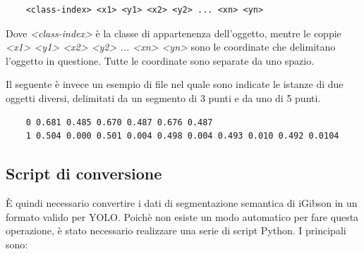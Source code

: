 \documentclass[12pt]{report}
\begin{document}
\begin{verbatim}
	<class-index> <x1> <y1> <x2> <y2> ... <xn> <yn>
\end{verbatim}

Dove \textit{<class-index>} è la classe di appartenenza dell'oggetto, mentre le coppie \textit{<x1> <y1> <x2> <y2> ... <xn> <yn>} sono le coordinate che delimitano l'oggetto in questione. Tutte le coordinate sono separate da uno spazio.

Il seguente è invece un esempio di file nel quale sono indicate le istanze di due oggetti diversi, delimitati da un segmento di 3 punti e da uno di 5 punti.

\begin{verbatim}
	0 0.681 0.485 0.670 0.487 0.676 0.487
	1 0.504 0.000 0.501 0.004 0.498 0.004 0.493 0.010 0.492 0.0104
\end{verbatim}

\subsection{Script di conversione}
\label{chap:script_di_conversione}

È quindi necessario convertire i dati di segmentazione semantica di iGibson in un formato valido per YOLO. Poichè non esiste un modo automatico per fare questa operazione, è stato necessario realizzare una serie di script Python. I principali sono:
\end{document}
